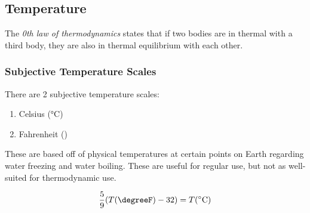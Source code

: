 \subsection{Temperature}\label{subsec:Temperature}
\begin{definition}\label{def:0_Law_Thermo}
  The \emph{0th law of thermodynamics} states that if two bodies are in thermal  with a third body, they are also in thermal equilibrium with each other.
\end{definition}

\subsubsection{Subjective Temperature Scales}\label{subsubsec:Subjective_Temp_Scales}
There are 2 subjective temperature scales:
\begin{enumerate}[noitemsep]
\item Celsius (\si{\degreeCelsius})
\item Fahrenheit (\si{\degreeF})
\end{enumerate}

These are based off of physical temperatures at certain points on Earth regarding water freezing and water boiling.
These are useful for regular use, but not as well-suited for thermodynamic use.

\begin{equation}\label{eq:Fahrenheit_Celsius}
  \frac{5}{9} (\Temp(\si{\degreeF}) - 32) = \Temp(\si{\degreeCelsius})
\end{equation}


